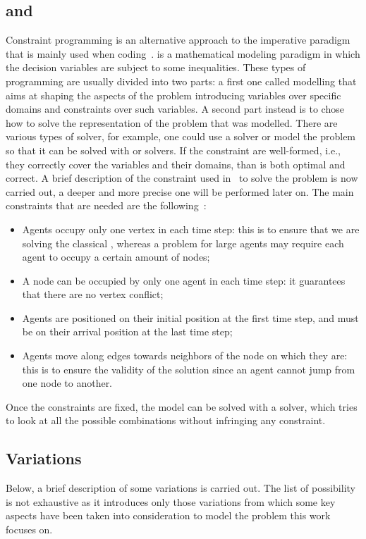 \subsection{ and }
Constraint programming is an alternative approach to the imperative paradigm
that is mainly used when coding~\cite{CP}.  is a mathematical
modeling paradigm in which the decision variables are subject to some
inequalities. These types of programming are usually divided into two parts: a
first one called modelling that aims at shaping the aspects of the problem 
introducing variables over specific domains and constraints over such
variables. A second part instead is to chose how to solve the representation of
the problem that was modelled. There are various types of solver, for example,
one could use a  solver or model the problem so that it can be solved
with  or  solvers. \newline
If the constraint are well-formed, i.e., they correctly cover the variables and
their domains, than  is both optimal and correct. A brief description
of the constraint used in~\cite{picat} to solve the  problem is now
carried out, a deeper and more precise one will be performed later on. The main
constraints that are needed are the following~\cite{MAPF_overview}:
\begin{itemize}
  \item Agents occupy only one vertex in each time step: this is to ensure that
    we are solving the classical , whereas a  problem for
    large agents may require each agent to occupy a certain amount of nodes;
  \item A node can be occupied by only one agent in each time step: it
    guarantees that there are no vertex conflict;
  \item Agents are positioned on their initial position at the first time step,
    and must be on their arrival position at the last time step;
  \item Agents move along edges towards neighbors of the node on which they 
    are: this is to ensure the validity of the solution since an agent cannot
    jump from one node to another. 
\end{itemize}
Once the constraints are fixed, the model can be solved with a solver, which
tries to look at all the possible combinations without infringing any
constraint. 
%
%
\subsection{ Variations}
Below, a brief description of some  variations is carried out. The
list of possibility is not exhaustive as it introduces only those variations
from which some key aspects have been taken into consideration to model the
problem this work focuses on. 
%

